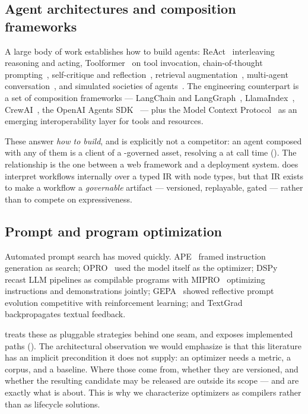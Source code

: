 \subsection{Agent architectures and composition frameworks}

A large body of work establishes how to build agents:
ReAct~\cite{yao2023react} interleaving reasoning and acting,
Toolformer~\cite{schick2023toolformer} on tool invocation,
chain-of-thought prompting~\cite{wei2022cot},
self-critique and reflection~\cite{madaan2023selfrefine,shinn2023reflexion},
retrieval augmentation~\cite{lewis2020rag}, multi-agent
conversation~\cite{wu2024autogen}, and simulated societies of
agents~\cite{park2023generative}. The engineering counterpart is a set of
composition frameworks --- LangChain and LangGraph~\cite{langchain},
LlamaIndex~\cite{llamaindex}, CrewAI~\cite{crewai}, the OpenAI Agents
SDK~\cite{agentssdk} --- plus the Model Context Protocol~\cite{mcp2024} as an
emerging interoperability layer for tools and resources.

These answer \emph{how to build}, and \sys is explicitly not a competitor: an
agent composed with any of them is a client of a \sys-governed asset, resolving a
\livetarget{} at call time (). The relationship is the one
between a web framework and a deployment system. \sys does interpret workflows
internally over a typed IR with \statNodeTypes{} node types, but that IR exists to
make a workflow a \emph{governable} artifact --- versioned, replayable, gated ---
rather than to compete on expressiveness.

\subsection{Prompt and program optimization}

Automated prompt search has moved quickly. APE~\cite{zhou2023ape} framed
instruction generation as search; OPRO~\cite{yang2024opro} used the model itself as
the optimizer; DSPy~\cite{khattab2024dspy} recast LLM pipelines as compilable
programs with MIPRO~\cite{opsahlong2024mipro} optimizing instructions and
demonstrations jointly; GEPA~\cite{agrawal2025gepa} showed reflective prompt
evolution competitive with reinforcement learning; and
TextGrad~\cite{yuksekgonul2024textgrad} backpropagates textual feedback.

\sys treats these as pluggable strategies behind one seam, and exposes
\statOptimizersW{} implemented paths (). The architectural
observation we would emphasize is that this literature has an implicit
precondition it does not supply: an optimizer needs a metric, a corpus, and a
baseline. Where those come from, whether they are versioned, and whether the
resulting candidate may be released are outside its scope --- and are exactly what
 is about. This is why we characterize optimizers as
compilers rather than as lifecycle solutions.


